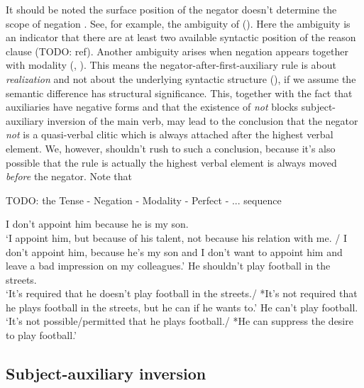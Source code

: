 \documentclass[UTF8, a4paper, oneside, scheme=plain, 12pt]{ctexbook}
\newcommand*{\citepage}[1]{p.~{#1}}
\newcommand{\form}[1]{\emph{#1}}
\newcommand{\translate}[1]{`#1'}
\begin{document}
It should be noted the surface position of the negator doesn't determine the scope of negation
\citep[\citepage{668}]{cgel}.
See, for example, the ambiguity of ().
Here the ambiguity is an indicator that 
there are at least two available syntactic position of the reason clause (TODO: ref).
Another ambiguity arises when negation appears together with modality
(, ).
This means the negator-after-first-auxiliary rule is about \emph{realization} 
and not about the underlying syntactic structure (),
if we assume the semantic difference has structural significance.
This, together with the fact that auxiliaries have negative forms
and that the existence of \form{not} blocks subject-auxiliary inversion 
of the main verb,
may lead to the conclusion that the negator \form{not} is a quasi-verbal clitic
which is always attached after the highest verbal element.
We, however, shouldn't rush to such a conclusion,
because it's also possible that 
the rule is actually the highest verbal element is always moved \emph{before} the negator.
Note that 

TODO: the Tense - Negation - Modality - Perfect - ... sequence

\begin{exe} 
    \ex\label{ex:verb-inflection.negation-ambiguity-1} 
    I don't appoint him because he is my son. \\
    \translate{I appoint him, but because of his talent, not because his relation with me. / 
    I don't appoint him, because he's my son and I don't want to appoint him and  
    leave a bad impression on my colleagues.}
    \ex\label{ex:verb-inflection.negation-ambiguity-2}
    He shouldn't play football in the streets. \\
    \translate{It's required that he doesn't play football in the streets./
    *It's not required that he plays football in the streets,
    but he can if he wants to.} 
    \ex\label{ex:verb-inflection.negation-ambiguity-3}
    He can't play football. \\
    \translate{It's not possible/permitted that he plays football./
    *He can suppress the desire to play football.}
\end{exe}   


\subsection{Subject-auxiliary inversion}\label{sec:sai}
\end{document}
